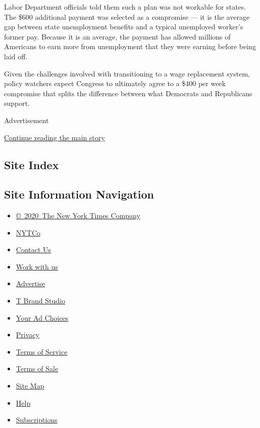 Labor Department officials told them such a plan was not workable for
states. The \$600 additional payment was selected as a compromise --- it
is the average gap between state unemployment benefits and a typical
unemployed worker's former pay. Because it is an average, the payment
has allowed millions of Americans to earn more from unemployment that
they were earning before being laid off.

Given the challenges involved with transitioning to a wage replacement
system, policy watchers expect Congress to ultimately agree to a \$400
per week compromise that splits the difference between what Democrats
and Republicans support.

Advertisement

\protect\hyperlink{after-bottom}{Continue reading the main story}

\hypertarget{site-index}{%
\subsection{Site Index}\label{site-index}}

\hypertarget{site-information-navigation}{%
\subsection{Site Information
Navigation}\label{site-information-navigation}}

\begin{itemize}
\tightlist
\item
  \href{https://help.nytimes.com/hc/en-us/articles/115014792127-Copyright-notice}{©~2020~The
  New York Times Company}
\end{itemize}

\begin{itemize}
\tightlist
\item
  \href{https://www.nytco.com/}{NYTCo}
\item
  \href{https://help.nytimes.com/hc/en-us/articles/115015385887-Contact-Us}{Contact
  Us}
\item
  \href{https://www.nytco.com/careers/}{Work with us}
\item
  \href{https://nytmediakit.com/}{Advertise}
\item
  \href{http://www.tbrandstudio.com/}{T Brand Studio}
\item
  \href{https://www.nytimes.com/privacy/cookie-policy\#how-do-i-manage-trackers}{Your
  Ad Choices}
\item
  \href{https://www.nytimes.com/privacy}{Privacy}
\item
  \href{https://help.nytimes.com/hc/en-us/articles/115014893428-Terms-of-service}{Terms
  of Service}
\item
  \href{https://help.nytimes.com/hc/en-us/articles/115014893968-Terms-of-sale}{Terms
  of Sale}
\item
  \href{https://spiderbites.nytimes.com}{Site Map}
\item
  \href{https://help.nytimes.com/hc/en-us}{Help}
\item
  \href{https://www.nytimes.com/subscription?campaignId=37WXW}{Subscriptions}
\end{itemize}
